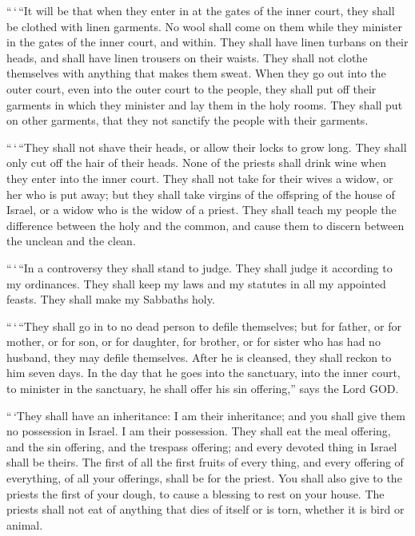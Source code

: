  ``\,`\,``It will be that when they enter in at the gates
of the inner court, they shall be clothed with linen garments. No wool
shall come on them while they minister in the gates of the inner court,
and within.  They shall have linen turbans on their
heads, and shall have linen trousers on their waists. They shall not
clothe themselves with anything that makes them sweat. 
When they go out into the outer court, even into the outer court to the
people, they shall put off their garments in which they minister and lay
them in the holy rooms. They shall put on other garments, that they not
sanctify the people with their garments.

 ``\,`\,``They shall not shave their heads, or allow
their locks to grow long. They shall only cut off the hair of their
heads.  None of the priests shall drink wine when they
enter into the inner court.  They shall not take for
their wives a widow, or her who is put away; but they shall take virgins
of the offspring of the house of Israel, or a widow who is the widow of
a priest.  They shall teach my people the difference
between the holy and the common, and cause them to discern between the
unclean and the clean.

 ``\,`\,``In a controversy they shall stand to judge.
They shall judge it according to my ordinances. They shall keep my laws
and my statutes in all my appointed feasts. They shall make my Sabbaths
holy.

 ``\,`\,``They shall go in to no dead person to defile
themselves; but for father, or for mother, or for son, or for daughter,
for brother, or for sister who has had no husband, they may defile
themselves.  After he is cleansed, they shall reckon to
him seven days.  In the day that he goes into the
sanctuary, into the inner court, to minister in the sanctuary, he shall
offer his sin offering,'' says the Lord GOD.

 ``\,`They shall have an inheritance: I am their
inheritance; and you shall give them no possession in Israel. I am their
possession.  They shall eat the meal offering, and the
sin offering, and the trespass offering; and every devoted thing in
Israel shall be theirs.  The first of all the first
fruits of every thing, and every offering of everything, of all your
offerings, shall be for the priest. You shall also give to the priests
the first of your dough, to cause a blessing to rest on your house.
 The priests shall not eat of anything that dies of
itself or is torn, whether it is bird or animal.


